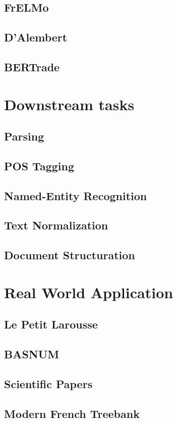 \documentclass{mimosis}
\begin{document}
\chapter{FrELMo}
\chapter{D'Alembert}
\chapter{BERTrade}

\part{Downstream tasks}
\chapter{Parsing}
\chapter{POS Tagging}
\chapter{Named-Entity Recognition}
\chapter{Text Normalization}
\chapter{Document Structuration}

\part{Real World Application}
\chapter{Le Petit Larousse}
\chapter{BASNUM}
\chapter{Scientific Papers}
\chapter{Modern French Treebank}
\end{document}
